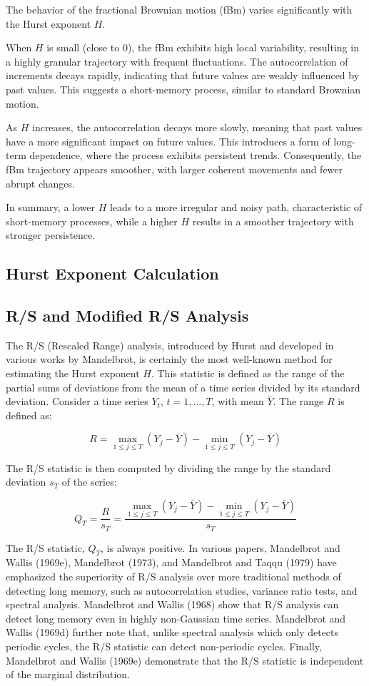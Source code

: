 \documentclass[11pt]{extarticle}
\begin{document}
\FloatBarrier

The behavior of the fractional Brownian motion (fBm) varies significantly with the Hurst exponent \( H \).

When \( H \) is small (close to 0), the fBm exhibits high local variability, resulting in a highly granular trajectory with frequent fluctuations. The autocorrelation of increments decays rapidly, indicating that future values are weakly influenced by past values. This suggests a short-memory process, similar to standard Brownian motion.

As \( H \) increases, the autocorrelation decays more slowly, meaning that past values have a more significant impact on future values. This introduces a form of long-term dependence, where the process exhibits persistent trends. Consequently, the fBm trajectory appears smoother, with larger coherent movements and fewer abrupt changes.

In summary, a lower \( H \) leads to a more irregular and noisy path, characteristic of short-memory processes, while a higher \( H \) results in a smoother trajectory with stronger persistence.

\subsection{Hurst Exponent Calculation}
\subsection{R/S and Modified R/S Analysis}
The R/S (Rescaled Range) analysis, introduced by Hurst and developed in various works by Mandelbrot, is certainly the most well-known method for estimating the Hurst exponent $H$. This statistic is defined as the range of the partial sums of deviations from the mean of a time series divided by its standard deviation. Consider a time series $Y_t$, $t = 1, ..., T$, with mean $\bar{Y}$. The range $R$ is defined as:

\[
R = \max_{1 \leq j \leq T} \left( Y_j - \bar{Y} \right) - \min_{1 \leq j \leq T} \left( Y_j - \bar{Y} \right)
\]

The R/S statistic is then computed by dividing the range by the standard deviation $s_T$ of the series:

\[
Q_T = \frac{R}{s_T} = \frac{\max_{1 \leq j \leq T} \left( Y_j - \bar{Y} \right) - \min_{1 \leq j \leq T} \left( Y_j - \bar{Y} \right)}{s_T}
\]

The R/S statistic, $Q_T$, is always positive. In various papers, Mandelbrot and Wallis (1969e), Mandelbrot (1973), and Mandelbrot and Taqqu (1979) have emphasized the superiority of R/S analysis over more traditional methods of detecting long memory, such as autocorrelation studies, variance ratio tests, and spectral analysis. Mandelbrot and Wallis (1968) show that R/S analysis can detect long memory even in highly non-Gaussian time series. Mandelbrot and Wallis (1969d) further note that, unlike spectral analysis which only detects periodic cycles, the R/S statistic can detect non-periodic cycles. Finally, Mandelbrot and Wallis (1969e) demonstrate that the R/S statistic is independent of the marginal distribution.
\end{document}
